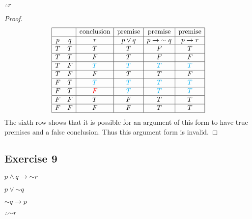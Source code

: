 \documentclass[14pt]{extarticle}
\begin{document}
$\therefore r$

\begin{proof}
    $$
        \begin{array}{|cc|c|c|c|c|}
            \hline
              &   & \text{conclusion} & \text{premise} & \text{premise} & \text{premise} \\
            \hline
            p & q & r                 & p \vee q       & p \to {\sim q} & p \to r        \\
            \hline
            T & T & T                 & T              & F              & T              \\
            \hline
            T & T & F                 & T              & F              & F              \\
            \hline
            T & F & \color{cyan} T    & \color{cyan} T & \color{cyan} T & \color{cyan} T \\
            \hline
            T & F & F                 & T              & T              & F              \\
            \hline
            F & T & \color{cyan} T    & \color{cyan} T & \color{cyan} T & \color{cyan} T \\
            \hline
            F & T & \color{red} F     & \color{cyan} T & \color{cyan} T & \color{cyan} T \\
            \hline
            F & F & T                 & F              & T              & T              \\
            \hline
            F & F & F                 & F              & T              & T              \\
            \hline
        \end{array}
    $$
    The sixth row shows that it is possible for an argument of this form to have true premises and a false conclusion. Thus this argument form is invalid.
\end{proof}

\subsection{Exercise 9}
$p \wedge q \to {\sim r}$

$p \vee {\sim q}$

${\sim q} \to p$

$\therefore {\sim r}$
\end{document}
